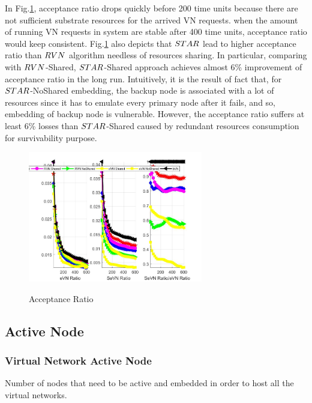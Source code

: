 In Fig.\ref{fig:AcceptionRatio}, acceptance ratio drops quickly before 200 time units because there are not sufficient substrate resources for the arrived VN requests. when the amount of running VN requests in system are stable after 400 time units, acceptance ratio would keep consistent. Fig.\ref{fig:AcceptionRatio} also depicts that $STAR$ lead to higher acceptance ratio than $RVN$ algorithm needless of resources sharing. In particular, comparing with $RVN$-Shared, $STAR$-Shared approach achieves almost 6\% improvement of acceptance ratio in the long run. Intuitively, it is the result of fact that, for $STAR$-NoShared embedding, the backup node is associated with a lot of resources since it has to emulate every primary node after it fails, and so, embedding of backup node is vulnerable. However, the acceptance ratio suffers at least 6\% losses than $STAR$-Shared caused by redundant resources consumption for survivability purpose.

\begin{figure}
  \centering
  \includegraphics[width=3in]{Fig/AcceptionRatio}\\
  \caption{Acceptance Ratio}\label{fig:AcceptionRatio}
\end{figure}
\subsection{Active Node}
\subsubsection{Virtual Network Active Node}
Number of nodes that need to be active and embedded in order to host all the virtual networks.


